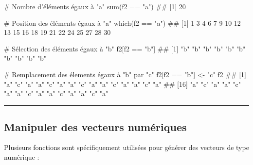 \documentclass[12pt,twosided, notitlepage]{book}
\newenvironment{Shaded}{}{}
\newcommand{\KeywordTok}[1]{\textcolor[rgb]{0.00,0.00,1.00}{#1}}
\newcommand{\StringTok}[1]{\textcolor[rgb]{0.00,0.50,0.50}{#1}}
\newcommand{\CommentTok}[1]{\textcolor[rgb]{0.00,0.50,0.00}{#1}}
\newcommand{\OperatorTok}[1]{#1}
\newcommand{\NormalTok}[1]{#1}
\renewenvironment{Shaded}{\begin{snugshade}}{\end{snugshade}}
\begin{document}
\begin{enumerate}
\begin{Shaded}
\begin{Highlighting}[]
\CommentTok{# Nombre d'éléments égaux à "a"}
\KeywordTok{sum}\NormalTok{(f2 }\OperatorTok{==}\StringTok{ "a"}\NormalTok{)}
\NormalTok{  ## [1] 20}

\CommentTok{# Position des éléments égaux à "a"}
\KeywordTok{which}\NormalTok{(f2 }\OperatorTok{==}\StringTok{ "a"}\NormalTok{)}
\NormalTok{  ##  [1]  1  3  4  6  7  9 10 12 13 15 16 18 19 21 22 24 25 27 28 30}

\CommentTok{# Sélection des éléments égaux à "b"}
\NormalTok{f2[f2 }\OperatorTok{==}\StringTok{ "b"}\NormalTok{]}
\NormalTok{  ##  [1] "b" "b" "b" "b" "b" "b" "b" "b" "b" "b"}

\CommentTok{# Remplacement des élements égaux à "b" par "c"}
\NormalTok{f2[f2 }\OperatorTok{==}\StringTok{ "b"}\NormalTok{] <-}\StringTok{ "c"}
\NormalTok{f2}
\NormalTok{  ##  [1] "a" "c" "a" "a" "c" "a" "a" "c" "a" "a" "c" "a" "a" "c" "a"}
\NormalTok{  ## [16] "a" "c" "a" "a" "c" "a" "a" "c" "a" "a" "c" "a" "a" "c" "a"}
\end{Highlighting}
\end{Shaded}

  \begin{center} \rule{0.5\linewidth}{\linethickness}\end{center}

  \bigskip  \fi 
\end{enumerate}

\subsection{Manipuler des vecteurs
numériques}\label{manipuler-des-vecteurs-numeriques}

Plusieurs fonctions sont spécifiquement utilisées pour générer des
vecteurs de type numérique :
\end{document}

